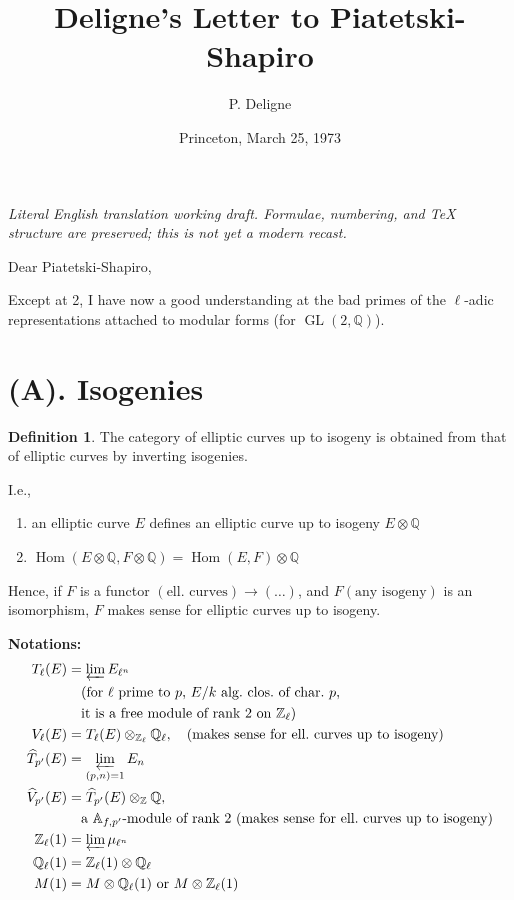 \documentclass[11pt,a4paper]{article}
\title{Deligne's Letter to Piatetski-Shapiro}
\date{Princeton, March 25, 1973}
\author{P. Deligne}
\theoremstyle{plain}
\theoremstyle{definition}
\newtheorem{definition}[theorem]{Definition}
\theoremstyle{remark}
\DeclareMathOperator{\Hom}{Hom}
\DeclareMathOperator{\GL}{GL}
\newcommand{\A}{\mathbb{A}}
\newcommand{\Q}{\mathbb{Q}}
\newcommand{\Z}{\mathbb{Z}}
\newcommand{\Zl}{\mathbb{Z}_{\ell}}
\newcommand{\Ql}{\mathbb{Q}_{\ell}}
\newcommand{\Vl}{V_{\ell}}
\newcommand{\Tl}{T_{\ell}}
\begin{document}
\begin{center}\small\emph{Literal English translation working draft. Formulae, numbering, and TeX structure are preserved; this is not yet a modern recast.}\end{center}
\vspace{0.5em}


\maketitle

\noindent
Dear Piatetski-Shapiro,

\medskip

Except at 2, I have now a good understanding at the bad primes of the $\ell$-adic representations attached to modular forms (for $\GL(2, \Q)$).

\bigskip

\section*{(A). Isogenies}

\begin{definition}
The category of elliptic curves up to isogeny is obtained from that of elliptic curves by inverting isogenies.

I.e.,
\begin{enumerate}[label=(\alph*)]
\item an elliptic curve $E$ defines an elliptic curve up to isogeny $E \otimes \Q$
\item $\Hom(E \otimes \Q, F \otimes \Q) = \Hom(E, F) \otimes \Q$
\end{enumerate}

Hence, if $F$ is a functor $(\text{ell.\ curves}) \to (\ldots)$, and $F(\text{any isogeny})$ is an isomorphism, $F$ makes sense for elliptic curves up to isogeny.
\end{definition}

\noindent
\textbf{Notations:}
\begin{align*}
\Tl(E) &= \varprojlim E_{\ell^{n}} \\
&\quad (\text{for $\ell$ prime to $p$, $E/k$ alg.\ clos.\ of char.\ $p$,} \\
&\quad \text{it is a free module of rank 2 on $\Zl$}) \\
\Vl(E) &= \Tl(E) \otimes_{\Zl} \Ql, \quad (\text{makes sense for ell.\ curves up to isogeny}) \\
\widehat{T}_{p'}(E) &= \varprojlim_{(p,n)=1} E_{n} \\
\widehat{V}_{p'}(E) &= \widehat{T}_{p'}(E) \otimes_{\Z} \Q, \\
&\quad \text{a $\A_{f,p'}$-module of rank 2 (makes sense for ell.\ curves up to isogeny)} \\
\Zl(1) &= \varprojlim \mu_{\ell^{n}} \\
\Ql(1) &= \Zl(1) \otimes \Ql \\
M(1) &= M \otimes \Ql(1) \text{ or } M \otimes \Zl(1)
\end{align*}
\end{document}
